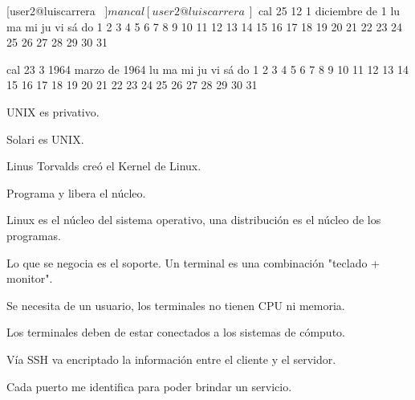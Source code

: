 \documentclass{memoir}
\begin{document}
[user2@luiscarrera ~]$


 man cal
[user2@luiscarrera ~]$ cal 25 12 1
   diciembre de 1
lu ma mi ju vi sá do
          1  2  3  4
 5  6  7  8  9 10 11
12 13 14 15 16 17 18
19 20 21 22 23 24 25
26 27 28 29 30 31


cal 23 3 1964
    marzo de 1964
lu ma mi ju vi sá do
                   1
 2  3  4  5  6  7  8
 9 10 11 12 13 14 15
16 17 18 19 20 21 22
23 24 25 26 27 28 29
30 31



UNIX es privativo.

Solari es UNIX.

Linus Torvalds creó el Kernel de Linux.

Programa y libera el núcleo.

Linux es el núcleo del sistema operativo, una distribución es el núcleo de los programas.

Lo que se negocia es el soporte.
Un terminal es una combinación "teclado + monitor".

Se necesita de un usuario, los terminales no tienen CPU ni memoria.

Los terminales deben de estar conectados a los sistemas de cómputo.


Vía SSH va encriptado la información entre el cliente y el servidor.

Cada puerto me identifica para poder brindar un servicio.

\end{document}
